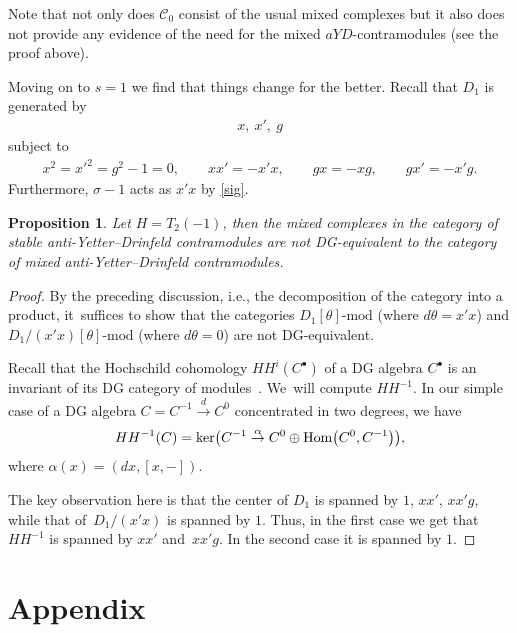 \documentclass[10pt,a4paper]{amsart}
\numberwithin{equation}{section}
\newtheorem{Proposition}[Theorem]{Proposition}
\newcommand{\Cc}{\mathcal{C}}
\begin{document}
 \begin{Remark}
 Note that not only does $\Cc_0$ consist of the usual mixed complexes but it also does not provide any evidence of the need for the mixed $aYD$-contramodules (see the proof above).
 \end{Remark}

Moving on to $s=1$ we find that things change for the better. Recall that $D_1$ is generated by
\begin{gather}
x,\ x',\ g
\end{gather}
subject to
\begin{gather}
x^2=x'^2=g^2-1=0, \qquad
xx'=-x'x, \qquad
gx=-xg, \qquad
gx'=-x'g.
\end{gather}
Furthermore, $\sigma-1$ acts as $x'x$ by \eqref{sig}.


\begin{Proposition}\label{notsscase}
Let $H=T_2(-1)$, then the mixed complexes in the category of stable anti-Yetter--Drinfeld contramodules are not DG-equivalent to the category of mixed anti-Yetter--Drinfeld contramodules.
\end{Proposition}

\begin{proof}
By the preceding discussion, i.e., the decomposition of the category into a product, it~suf\-fices to show that the categories $D_1[\theta]\text{-mod}$ (where $d\theta=x'x$) and $D_1/(x'x)[\theta]\text{-mod}$ (where $d\theta =0$) are not DG-equivalent.

Recall that the Hochschild cohomology $HH^i(C^\bullet)$ of a DG algebra $C^\bullet$ is an invariant of its DG category of modules~\cite{dginvar}. We~will compute $HH^{-1}$. In our simple case of a DG algebra $C=C^{-1}\stackrel{d}{\to} C^0$ concentrated in two degrees, we have
\begin{gather}
HH^{-1}(C)={\rm ker} \big(C^{-1}\stackrel{\alpha}{\to} C^0\oplus {\rm Hom}\big(C^0, C^{-1}\big)\big),
\end{gather}
where $\alpha(x)=(dx, [x,-])$.

The key observation here is that the center of $D_1$ is spanned by $1$, $xx'$, $xx'g$, while that of~$D_1/(x'x)$ is spanned by $1$. Thus, in the first case we get that $HH^{-1}$ is spanned by $xx'$ and~$xx'g$. In the second case it is spanned by $1$.
\end{proof}


\appendix

\section{Appendix}\label{appx}
\end{document}
